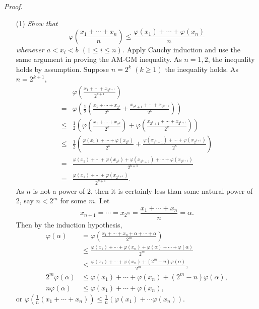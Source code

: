 \documentclass{article}
\begin{document}
\emph{Proof.}
\begin{enumerate}
\item[(1)]
\emph{Show that
$$\varphi\left( \frac{x_1 + \cdots + x_n}{n} \right)
\leq \frac{\varphi(x_1) + \cdots + \varphi(x_n)}{n}$$
whenever $a < x_i < b$ $(1 \leq i \leq n)$.}
Apply Cauchy induction and use the same argument in proving the AM-GM inequality.
As $n = 1, 2$, the inequality holds by assumption.
Suppose $n = 2^k$ $(k \geq 1)$ the inequality holds.
As $n = 2^{k+1}$,
\begin{align*}
&\varphi\left( \frac{x_1 + \cdots + x_{2^{k+1}}}{2^{k+1}} \right) \\
=& \varphi\left( \frac{1}{2} \left(\frac{x_1 + \cdots + x_{2^k}}{2^k}
  + \frac{x_{2^k+1} + \cdots + x_{2^{k+1}}}{2^k}\right) \right) \\
\leq& \frac{1}{2}
  \left(
    \varphi\left(\frac{x_1 + \cdots + x_{2^k}}{2^k} \right)
    + \varphi\left(\frac{x_{2^k+1} + \cdots + x_{2^{k+1}}}{2^k} \right)
  \right) \\
\leq& \frac{1}{2}
  \left(
    \frac{\varphi(x_1) + \cdots + \varphi(x_{2^k})}{2^k}
    + \frac{\varphi(x_{2^k+1}) + \cdots + \varphi(x_{2^{k+1}})}{2^k}
  \right) \\
=& \frac{\varphi(x_1) + \cdots + \varphi(x_{2^k})
  + \varphi(x_{2^k+1}) + \cdots + \varphi(x_{2^{k+1}})}{2^{k+1}} \\
=& \frac{\varphi(x_1) + \cdots + \varphi(x_{2^{k+1}})}{2^{k+1}}.
\end{align*}
As $n$ is not a power of $2$,
then it is certainly less than some natural power of $2$, say $n < 2^m$ for some $m$.
Let
$$x_{n+1} = \cdots = x_{2^m} = \frac{x_1 + \cdots + x_n}{n} = \alpha.$$
Then by the induction hypothesis,
\begin{align*}
  \varphi(\alpha)
  &= \varphi\left( \frac{x_1 + \cdots + x_n + \alpha + \cdots + \alpha}{2^m} \right) \\
  &\leq \frac{\varphi(x_1) + \cdots + \varphi(x_n) + \varphi(\alpha) + \cdots + \varphi(\alpha)}{2^m} \\
  &\leq \frac{\varphi(x_1) + \cdots + \varphi(x_n) + (2^m - n)\varphi(\alpha)}{2^m}, \\
  2^m \varphi(\alpha)
  &\leq \varphi(x_1) + \cdots + \varphi(x_n) + (2^m - n)\varphi(\alpha), \\
  n \varphi(\alpha)
  &\leq \varphi(x_1) + \cdots + \varphi(x_n),
\end{align*}
or $\varphi\left( \frac{1}{n} (x_1 + \cdots + x_n) \right)
\leq \frac{1}{n}(\varphi(x_1) + \cdots \varphi(x_n))$.

\end{enumerate}
\end{document}
